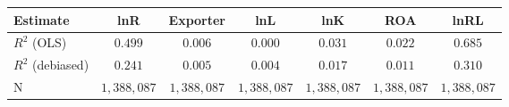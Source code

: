 \begin{tabular}{l*{6}{c}}
\hline\hline
 Estimate & lnR & Exporter & lnL & lnK & ROA & lnRL \\
\hline
\addlinespace $ R^2$ (OLS) & $0.499$ & $0.006$ & $0.000$ & $0.031$ & $0.022$ & $0.685$ \\
$ R^2$ (debiased) & $0.241$ & $0.005$ & $0.004$ & $0.017$ & $0.011$ & $0.310$ \\
N & $1,388,087$ & $1,388,087$ & $1,388,087$ & $1,388,087$ & $1,388,087$ & $1,388,087$ \\
\hline\hline
\end{tabular}
